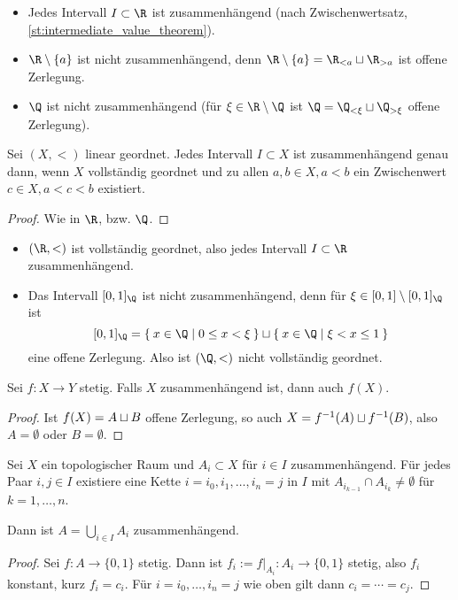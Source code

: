 \begin{ex}
	\begin{itemize}
		\item
			Jedes Intervall $I \subset \R$ ist zusammenhängend (nach Zwischenwertsatz, \ref{st:intermediate_value_theorem}).
		\item
			$\R \setminus \{a\}$ ist nicht zusammenhängend, denn $\R \setminus \{a\} = \R_{<a} \dunion \R_{>a}$ ist offene Zerlegung.
		\item
			$\Q$ ist nicht zusammenhängend (für $\xi \in \R \setminus \Q$ ist $\Q = \Q_{<\xi} \dunion \Q_{>\xi}$ offene Zerlegung).
	\end{itemize}
\end{ex}

\begin{st}
	Sei $(X, <)$ linear geordnet.
	Jedes Intervall $I \subset X$ ist zusammenhängend genau dann, wenn $X$ vollständig geordnet und zu allen $a, b \in X, a < b$ ein Zwischenwert $c \in X, a < c < b$ existiert.
	\begin{proof}
		Wie in $\R$, bzw. $\Q$.
	\end{proof}
\end{st}

\begin{ex}
	\begin{itemize}
		\item
			$(\R, <)$ ist vollständig geordnet, also jedes Intervall $I \subset \R$ zusammenhängend.
		\item
			Das Intervall $[0,1]_\Q$ ist nicht zusammenhängend, denn für $\xi \in [0,1] \setminus [0,1]_\Q$ ist
			\[
				[0,1]_\Q =
				\Set{ x \in \Q | 0 \le x < \xi }
				\dunion
				\Set{ x \in \Q | \xi < x \le 1 }
			\]
			eine offene Zerlegung.
			Also ist $(\Q, <)$ nicht vollständig geordnet.
	\end{itemize}
\end{ex}

\begin{st}
	Sei $f: X \to Y$ stetig.
	Falls $X$ zusammenhängend ist, dann auch $f(X)$.
	\begin{proof}
		Ist $f(X) = A \sqcup B$ offene Zerlegung, so auch $X = f^{-1}(A) \sqcup f^{-1}(B)$, also $A = \emptyset$ oder $B = \emptyset$.
	\end{proof}
\end{st}

\begin{lem}
	Sei $X$ ein topologischer Raum und $A_i \subset X$ für $i \in I$ zusammenhängend.
	Für jedes Paar $i,j \in I$ existiere eine Kette $i = i_0 , i_1, \dotsc, i_n = j$ in $I$ mit $A_{i_{k-1}} \cap A_{i_k} \neq \emptyset$ für $k = 1, \dotsc, n$.

	Dann ist $A = \bigcup_{i\in I} A_i$ zusammenhängend.
	\begin{proof}
		Sei $f: A \to \{0,1\}$ stetig.
		Dann ist $f_i := f|_{A_i}: A_i \to \{0,1\}$ stetig, also $f_i$ konstant, kurz $f_i = c_i$.
		Für $i = i_0, \dotsc, i_n = j$ wie oben gilt dann $c_i = \dotsb = c_j$.
	\end{proof}
\end{lem}

